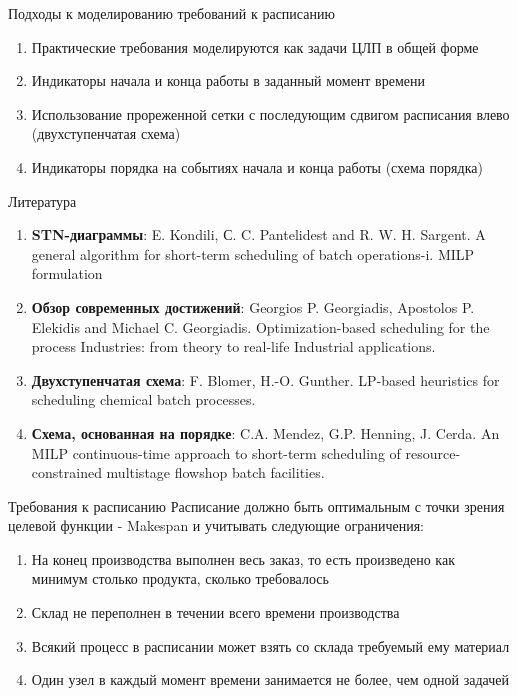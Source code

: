 \documentclass{beamer}
\begin{document}
\begin{frame}{Подходы к моделированию требований к расписанию}
\begin{enumerate}
	\item Практические требования моделируются как задачи ЦЛП в общей форме
	\item Индикаторы начала и конца работы в заданный момент времени 
	\item Использование прореженной сетки с последующим сдвигом расписания влево (двухступенчатая схема)
	\item Индикаторы порядка на событиях начала и конца работы (схема порядка)
\end{enumerate}

\end{frame}

\begin{frame}{Литература}
	\begin{enumerate}
	\item \textbf{STN-диаграммы}: E. Kondili, С. C. Pantelidest and R. W. H. Sargent. A general algorithm for short-term scheduling of batch operations-i. MILP formulation
	\item \textbf{Обзор современных достижений}: Georgios P. Georgiadis, Apostolos P. Elekidis and Michael C. Georgiadis. Optimization-based scheduling for the process Industries: from theory to real-life Industrial applications.
	\item \textbf{Двухступенчатая схема}: F. Blomer, H.-O. Gunther. LP-based heuristics for scheduling chemical batch processes.
	\item \textbf{Схема, основанная на порядке}: C.A. Mendez, G.P. Henning, J. Cerda. An MILP continuous-time approach to short-term scheduling of resource-constrained multistage flowshop batch facilities.
\end{enumerate}
\end{frame}

\begin{frame}{Требования к расписанию}
	Расписание должно быть оптимальным с точки зрения целевой функции - Makespan и учитывать следующие ограничения:
	\begin{enumerate}
	\item На конец производства выполнен весь заказ, то есть произведено как минимум столько продукта, сколько требовалось
	\item Склад не переполнен в течении всего времени производства
	\item Всякий процесс в расписании может взять со склада требуемый ему материал
	\item Один узел в каждый момент времени занимается не более, чем одной задачей
\end{enumerate}
\end{frame}
\end{document}
